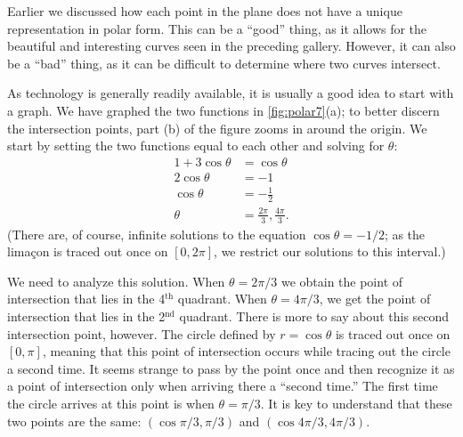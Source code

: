 \restoregeometry

\clearpage

Earlier we discussed how each point in the plane does not have a unique representation in polar form. This can be a ``good'' thing, as it allows for the beautiful and interesting curves seen in the preceding gallery. However, it can also be a ``bad'' thing, as it can be difficult to determine where two curves intersect.

{As technology is generally readily available, it is usually a good idea to start with a graph. We have graphed the two functions in \autoref{fig:polar7}(a); to better discern the intersection points, part (b) of the figure zooms in around the origin.
We start by setting the two functions equal to each other and solving for $\theta$:
\begin{align*}
1+3\cos\theta &= \cos \theta \\
2\cos\theta &= -1\\
\cos\theta&= -\frac12\\
\theta &= \frac{2\pi}{3}, \frac{4\pi}{3}.
\end{align*}
(There are, of course, infinite solutions to the equation $\cos\theta=-1/2$; as the lima\c con is traced out once on $[0,2\pi]$, we restrict our solutions to this interval.) 

We need to analyze this solution. When $\theta = 2\pi/3$ we obtain the point of intersection that lies in the 4$^\text{th}$ quadrant. When $\theta = 4\pi/3$, we get the point of intersection that lies in the 2$^\text{nd}$ quadrant. There is more to say about this second intersection point, however. The circle defined by $r=\cos\theta$ is traced out once on $[0,\pi]$, meaning that this point of intersection occurs while tracing out the circle a second time. It seems strange to pass by the point once and then recognize it as a point of intersection only when arriving there a ``second time.'' The first time the circle arrives at this point is when $\theta = \pi/3$.
It is key to understand that these two points are the same: $(\cos \pi/3,\pi/3)$ and $(\cos 4\pi/3,4\pi/3)$. 

}
